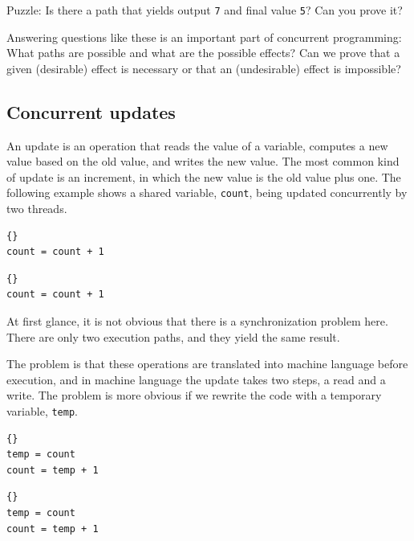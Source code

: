 \documentclass{book}
\begin{document}
Puzzle: Is there a path that yields output {\tt 7} and final
value {\tt 5}?  Can you prove it?

Answering questions like these is an important part of concurrent
programming:  What paths are possible and what are the
possible effects?  Can we prove that a given (desirable) effect is
necessary or that an (undesirable) effect is impossible?


\subsection {Concurrent updates}

An update is an operation that reads the value of a variable, computes
a new value based on the old value, and writes the new value.
The most common kind of update is an increment, in which the
new value is the old value plus one.  The following example
shows a shared variable, {\tt count}, being updated concurrently
by two threads.

\noindent\begin{minipage}[t]{0.4\textwidth}
    \begin{lstlisting}[title={Thread A}]{}
count = count + 1
\end{lstlisting}
\end{minipage}
\hfill
\noindent\begin{minipage}[t]{0.4\textwidth}
    \begin{lstlisting}[title={Thread B}]{}
count = count + 1
\end{lstlisting}
\end{minipage}

At first glance, it is not obvious that there is a synchronization
problem here.  There are only two execution paths, and they
yield the same result.

The problem is that these operations are translated into
machine language before execution, and in machine language
the update takes two steps, a read and a write.
The problem is more obvious if we rewrite the code with a temporary
variable, {\tt temp}.

\noindent\begin{minipage}[t]{0.4\textwidth}
    \begin{lstlisting}[title={Thread A}]{}
temp = count
count = temp + 1
\end{lstlisting}
\end{minipage}
\hfill
\noindent\noindent\begin{minipage}[t]{0.4\textwidth}
    \begin{lstlisting}[title={Thread B}]{}
temp = count
count = temp + 1
\end{lstlisting}
\end{minipage}
\end{document}
